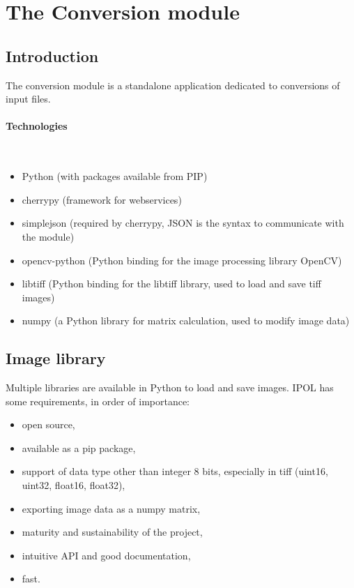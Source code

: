 \section{The Conversion module}
\label{sec:conversion}


\subsection{Introduction}
\label{sec:archive_introduction}

The conversion module is a standalone application dedicated to conversions of input files. 

\paragraph{Technologies} \hspace{0pt} \\
\begin{itemize}
\item Python (with packages available from PIP)
\item cherrypy (framework for webservices)
\item simplejson (required by cherrypy, JSON is the syntax to communicate with the module)
\item opencv-python (Python binding for the image processing library OpenCV)
\item libtiff (Python binding for the libtiff library, used to load and save tiff images)
\item numpy (a Python library for matrix calculation, used to modify image data)
\end{itemize}


\subsection{Image library}

Multiple libraries are available in Python to load and save images. IPOL has some requirements, in order of importance:

\begin{itemize}
\item open source,
\item available as a pip package,
\item support of data type other than integer 8 bits, especially in tiff (uint16, uint32, float16, float32),
\item exporting image data as a numpy matrix,
\item maturity and sustainability of the project,
\item intuitive API and good documentation,
\item fast.
\end{itemize}

